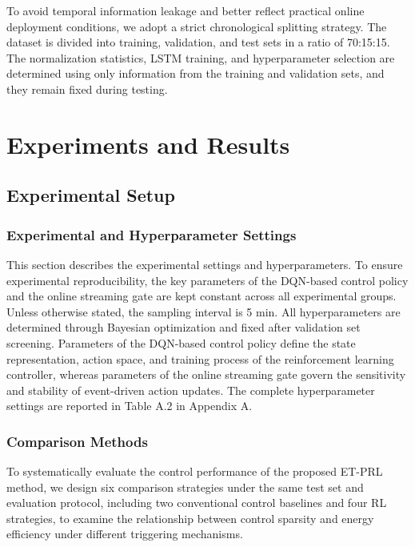 \documentclass[preprint,12pt,number]{elsarticle}
\begin{document}
To avoid temporal information leakage and better reflect practical online deployment conditions, we adopt a strict chronological splitting strategy. The dataset is divided into training, validation, and test sets in a ratio of 70:15:15. The normalization statistics, LSTM training, and hyperparameter selection are determined using only information from the training and validation sets, and they remain fixed during testing.

\section{Experiments and Results}\label{experiments-and-results}

\subsection{Experimental Setup}\label{experimental-setup}

\subsubsection{Experimental and Hyperparameter Settings}\label{experimental-and-hyperparameter-settings}

This section describes the experimental settings and hyperparameters. To ensure experimental reproducibility, the key parameters of the DQN-based control policy and the online streaming gate are kept constant across all experimental groups. Unless otherwise stated, the sampling interval is 5 min. All hyperparameters are determined through Bayesian optimization and fixed after validation set screening. Parameters of the DQN-based control policy define the state representation, action space, and training process of the reinforcement learning controller, whereas parameters of the online streaming gate govern the sensitivity and stability of event-driven action updates. The complete hyperparameter settings are reported in Table A.2 in Appendix A.

\subsubsection{Comparison Methods}\label{comparison-methods}

To systematically evaluate the control performance of the proposed ET-PRL method, we design six comparison strategies under the same test set and evaluation protocol, including two conventional control baselines and four RL strategies, to examine the relationship between control sparsity and energy efficiency under different triggering mechanisms.
\end{document}

